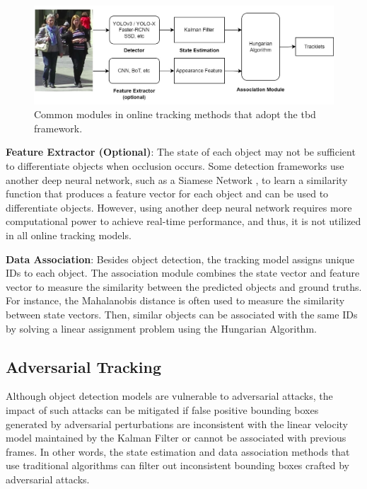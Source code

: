 \vspace{0.2cm}

\begin{figure}[H]
    \centering
    \includegraphics[width=\linewidth]{figures/chapter_tracking/track_module.jpg}
  \caption{Common modules in online tracking methods that adopt the \acrshort{tbd} framework.}
  \label{fig:tracking_module}
\end{figure}


\noindent\textbf{Feature Extractor (Optional)}: The state of each object may not be sufficient to differentiate objects when occlusion occurs. Some detection frameworks use another deep neural network, such as a Siamese Network \citep{li2019siamrpn++}, to learn a similarity function that produces a feature vector for each object and can be used to differentiate objects. However, using another deep neural network requires more computational power to achieve real-time performance, and thus, it is not utilized in all online tracking models.

\vspace{0.2cm}

\noindent\textbf{Data Association}: Besides object detection, the tracking model assigns unique IDs to each object. The association module combines the state vector and feature vector to measure the similarity between the predicted objects and ground truths. For instance, the Mahalanobis distance is often used to measure the similarity between state vectors. Then, similar objects can be associated with the same IDs by solving a linear assignment problem using the Hungarian Algorithm.

\subsection{Adversarial Tracking}

Although object detection models are vulnerable to adversarial attacks, the impact of such attacks can be mitigated if false positive bounding boxes generated by adversarial perturbations are inconsistent with the linear velocity model maintained by the Kalman Filter or cannot be associated with previous frames. In other words, the state estimation and data association methods that use traditional algorithms can filter out inconsistent bounding boxes crafted by adversarial attacks.

